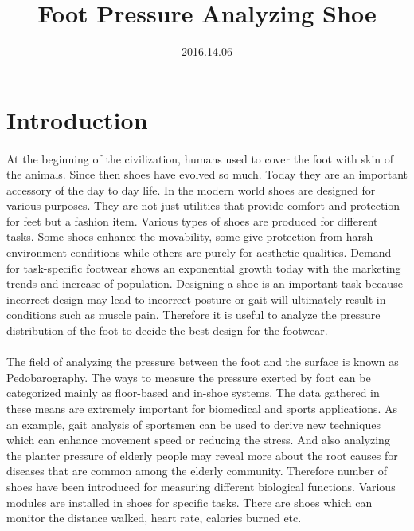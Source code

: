 \documentclass[a4paper]{report}
\title{Foot Pressure Analyzing Shoe}
\date{2016.14.06}
\begin{document}
	
	\maketitle
	
	\tableofcontents
	
	\newpage
	
	\section{Introduction}
	\paragraph{}
	At the beginning of the civilization, humans used to cover the foot with skin of the animals. Since then shoes have evolved so much. Today they are an important accessory of the day to day life. In the modern world shoes are designed for various purposes. They are not just utilities that provide comfort and protection for feet but a fashion item. 
	Various types of shoes are produced for different tasks. Some shoes enhance the movability, some give protection from harsh environment conditions while others are purely for aesthetic qualities. Demand for task-specific footwear shows an exponential growth today with the marketing trends and increase of population. Designing a shoe is an important task because incorrect design may lead to incorrect posture or gait will ultimately result in conditions such as muscle pain. Therefore it is useful to analyze the pressure distribution of the foot to decide the best design for the footwear.
	
	\paragraph{}
	The field of analyzing the pressure between the foot and the surface is known as Pedobarography. The ways to measure the pressure exerted by foot can be categorized mainly as floor-based and in-shoe systems. The data gathered in these means are extremely important for biomedical and sports applications. As an example, gait analysis of sportsmen can be used to derive new techniques which can enhance movement speed or reducing the stress. And also analyzing the planter pressure of elderly people may reveal more about the root causes for diseases that are common among the elderly community. Therefore number of shoes have been introduced for measuring different biological functions. Various modules are installed in shoes for specific tasks. There are shoes which can monitor the distance walked, heart rate, calories burned etc. 
	
\end{document}
